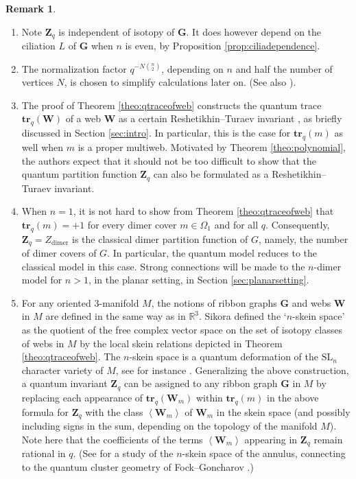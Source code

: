 \documentclass[12pt, reqno]{amsart}
\theoremstyle{definition}
\newtheorem{rema}[theo]{Remark}
\newcommand{\Zq}{\mathbf{Z}_q}%
\newcommand{\R}{\mathbb{R}}%
\newcommand{\trq}{\mathbf{tr}_q}%
\newcommand{\SL}{\mathrm{SL}}%
\begin{document}
\begin{rema}\label{rema:afterfirstdefofqpartitionfunction}
\begin{enumerate}
\item
Note $\Zq$ is independent of isotopy of $\mathbf{G}$.  It does however depend on the ciliation $L$ of $\mathbf{G}$ when $n$ is even, by Proposition \ref{prop:ciliadependence}.  
\item
The normalization factor $q^{-N\binom{n}{2}}$, depending on $n$ and half the number of vertices $N$, is chosen to simplify calculations later on.  (See also \cite[Section 11.2]{LESIKORA}).
\item
The proof of Theorem \ref{theo:qtraceofweb} constructs the quantum trace $\trq(\mathbf{W})$ of a web $\mathbf{W}$ as a certain Reshetikhin--Turaev invariant \cite{reshetikhin1}, as briefly discussed in Section \ref{sec:intro}. In particular, this is the case for $\trq(m)$ as well when $m$ is a proper multiweb.  Motivated by Theorem \ref{theo:polynomial}, the authors expect that it should not be too difficult to show that the quantum partition function $\Zq$ can also be formulated as a Reshetikhin--Turaev invariant.  
\item\label{item:rema:afterfirstdefofqpartitionfunction}
When $n=1$, it is not hard to show from Theorem \ref{theo:qtraceofweb} that $\trq(m)=+1$ for every dimer cover $m\in\Omega_1$ and for all $q$.  Consequently, $\Zq=Z_\mathrm{dimer}$ is the classical dimer partition function of $G$, namely, the number of dimer covers of $G$.  In particular, the quantum model reduces to the classical model in this case.  Strong connections will be made to the $n$-dimer model for $n>1$, in the planar setting, in Section \ref{sec:planarsetting}.
\item  
For any oriented $3$-manifold $M$, the notions of ribbon graphs $\mathbf{G}$ and webs $\mathbf{W}$ in $M$ are defined in the same way as in $\R^3$.  Sikora \cite{sikora1} defined the `$n$-skein space' as the quotient of the free complex vector space on the set of isotopy classes of webs in $M$ by the local skein relations depicted in Theorem \ref{theo:qtraceofweb}.  The $n$-skein space is a quantum deformation of the $\SL_n$ character variety of $M$, see for instance \cite[Corollary 20]{sikora1}.  Generalizing the above construction, a quantum invariant $\Zq$ can be assigned to any ribbon graph $\mathbf{G}$ in $M$ by replacing each appearance of $\trq(\mathbf{W}_m)$ within $\trq(m)$ in the above formula for $\Zq$ with the class $\left<\mathbf{W}_m\right>$ of $\mathbf{W}_m$ in the skein space  (and possibly including signs in the sum, depending on the topology of the manifold $M$).    Note here that the coefficients of the terms $\left<\mathbf{W}_m\right>$ appearing in $\Zq$ remain rational in $q$.  (See \cite{cremaschi1} for a study of the $n$-skein space of the annulus, connecting to the quantum cluster geometry of Fock--Goncharov \cite{FG}.)
\end{enumerate}
\end{rema}
\end{document}
